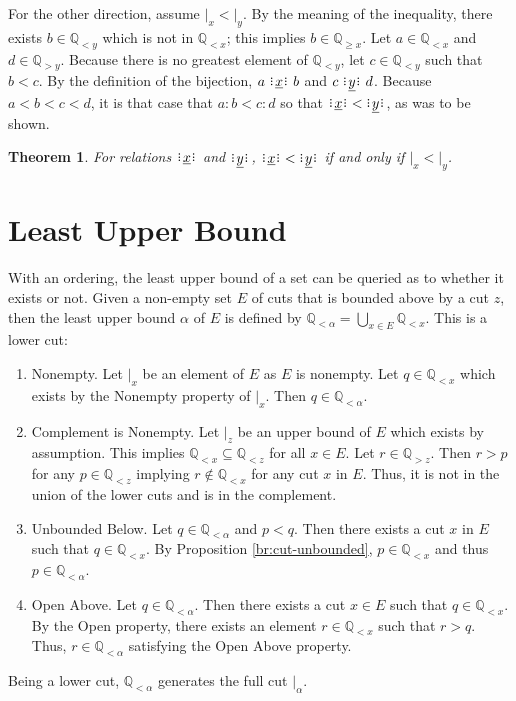 \documentclass[12pt]{article}
\newtheorem{theorem}{Theorem}
\newcommand{\qcut}[2][x]{\ensuremath{\mathbb{Q}_{#2 #1}}}
\newcommand{\qlt}[1][x]{\qcut[#1]{<}}
\newcommand{\qgt}[1][x]{\qcut[#1]{>}}
\newcommand{\qgeq}[1][x]{\qcut[#1]{\geq}}
\newcommand{\cut}[1][x]{{\vert}_{#1} }
\newcommand{\yrel}{\xrel[y]}
\begin{document}
For the other direction, assume $\cut < \cut[y]$. By the meaning of the inequality, there exists $b \in \qlt[y]$ which is not in $\qlt$; this implies $b \in \qgeq$. Let $a \in \qlt$ and $d \in \qgt[y]$.  Because there is no greatest element of $\qlt[y]$, let $c\in \qlt[y]$ such that $b < c$. By the definition of the bijection,  $a \xrel b$ and $c \yrel d$. Because $a < b < c < d$, it is that case that $a:b < c:d$ so that $\xrel  \:<\: \yrel$, as was to be shown. 

\begin{theorem}
For relations $\xrel$ and $\yrel$, $\xrel  \:<\: \yrel$ if and only if $\cut < \cut[y]$.
\end{theorem}

\section{Least Upper Bound}

With an ordering, the least upper bound of a set can be queried as to whether it exists or not. Given a non-empty set $E$ of cuts that is bounded above by a cut $z$, then the least upper bound $\alpha$ of $E$ is defined by $\qlt[\alpha] = \bigcup_{x \in E} \qlt$. This is a lower cut: 
\begin{enumerate}
    \item Nonempty. Let $\cut$ be an element of $E$ as $E$ is nonempty. Let $q \in \qlt$ which exists by the Nonempty property of $\cut$. Then $q \in \qlt[\alpha]$.
    \item Complement is Nonempty. Let $\cut[z]$ be an upper bound of $E$ which exists by assumption. This implies $\qlt \subseteq \qlt[z]$ for all $x \in E$. Let $r \in \qgt[z]$. Then $r > p$ for any $p \in \qlt[z]$ implying $r \notin \qlt[x]$ for any cut $x$ in $E$. Thus, it is not in the union of the lower cuts and is in the complement. 
    \item Unbounded Below. Let $q \in \qlt[\alpha]$ and $p < q$. Then there exists a cut $x$ in $E$ such that $q \in \qlt$. By Proposition \ref{br:cut-unbounded}, $p \in \qlt$ and thus $p \in \qlt[\alpha]$.
    \item Open Above. Let $q \in \qlt[\alpha]$. Then there exists a cut $x \in E$ such that $q \in \qlt$. By the Open property, there exists an element $r \in \qlt$ such that $r > q$. Thus, $r \in \qlt[\alpha]$ satisfying the Open Above property. 
\end{enumerate}
Being a lower cut, $\qlt[\alpha]$ generates the full cut $\cut[\alpha]$.
\end{document}

